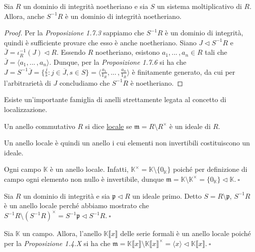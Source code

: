 \begin{cor}[1.7.7]{}
Sia $R$ un dominio di integrità noetheriano e sia $S$ un sistema moltiplicativo di $R$. Allora, anche $S^{-1}R$ è un dominio di integrità noetheriano.
\end{cor}
\vspace{-4mm}
\begin{proof}
Per la \emph{Proposizione 1.7.3} sappiamo che $S^{-1}R$ è un dominio di integrità, quindi è sufficiente provare che esso è anche noetheriano. Siano $J\lhd S^{-1}R$ e $\overline{J}=\iota_R^{-1}(J)\lhd R$. Essendo $R$ noetheriano, esistono $a_1,...\,,a_n\in R$ tali che $\overline{J}=\langle a_1,...\,,a_n \rangle$. Dunque, per la \emph{Proposizione 1.7.6} si ha che $J=S^{-1}\overline{J}=\{\frac{j}{s}: j\in\overline{J}, s\in S\}=\langle \frac{a_1}{1_R},...\,,\frac{a_n}{1_R} \rangle$ è finitamente generato, da cui per l'arbitrarietà di $J$ concludiamo che $S^{-1}R$ è noetheriano.
\end{proof}

\noindent Esiste un'importante famiglia di anelli strettamente legata al concetto di localizzazione.

\begin{defn}[]{}
Un anello commutativo $R$ si dice \underline{locale} se $\mathfrak{m}=R\setminus R^{\times}$ è un ideale di $R$.
\end{defn}

\noindent Un anello locale è quindi un anello i cui elementi non invertibili costituiscono un ideale.

\begin{exm}Ogni campo $\mathbb{K}$ è un anello locale. Infatti, $\mathbb{K}^{\times}=\mathbb{K}\setminus \{0_{\mathbb{K}}\}$ poiché per definizione di campo ogni elemento non nullo è invertibile, dunque $\mathfrak{m}=\mathbb{K}\setminus\mathbb{K}^{\times}=\{0_{\mathbb{K}}\}\lhd \mathbb{K}. \ \square$\end{exm}

\begin{exm}Sia $R$ un dominio di integrità e sia $\mathfrak{p}\lhd R$ un ideale primo. Detto $S=R\setminus \mathfrak{p}$, $S^{-1}R$ è un anello locale perché abbiamo mostrato che $S^{-1}R \setminus (S^{-1}R)^{\times}=S^{-1}\mathfrak{p}\lhd S^{-1}R. \ \square$\end{exm}

\begin{exm} Sia $\mathbb{K}$ un campo. Allora, l'anello $\mathbb{K}\llbracket x\rrbracket$ delle serie formali è un anello locale poiché per la \emph{Proposizione 1.4.X} si ha che $\mathfrak{m}=\mathbb{K}\llbracket x\rrbracket\setminus\mathbb{K}\llbracket x\rrbracket^{\times}=\langle x \rangle\lhd \mathbb{K}\llbracket x\rrbracket. \ \square$\end{exm}

